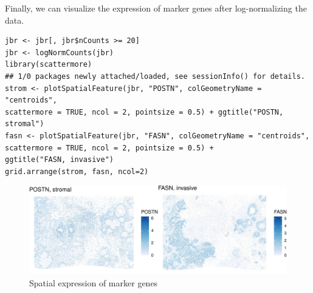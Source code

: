 \documentclass[graybox]{svmult}
\begin{document}
Finally, we can visualize the expression of marker genes after log-normalizing
the data.

\begin{shaded}
\begin{verbatim}
jbr <- jbr[, jbr$nCounts >= 20]
jbr <- logNormCounts(jbr)
library(scattermore)
## 1/0 packages newly attached/loaded, see sessionInfo() for details.
strom <- plotSpatialFeature(jbr, "POSTN", colGeometryName = "centroids",
scattermore = TRUE, ncol = 2, pointsize = 0.5) + ggtitle("POSTN, stromal")
fasn <- plotSpatialFeature(jbr, "FASN", colGeometryName = "centroids",
scattermore = TRUE, ncol = 2, pointsize = 0.5) +
ggtitle("FASN, invasive")
grid.arrange(strom, fasn, ncol=2)
\end{verbatim}
\end{shaded}

%
%

\begin{figure}
\includegraphics[width=1\linewidth,]{spatpdfs/sfemark-1} \caption{Spatial expression of marker genes}\label{fig:sfemark}
\end{figure}
\end{document}
